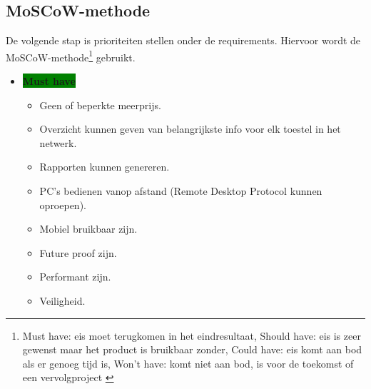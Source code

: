 \subsection{MoSCoW-methode}

De volgende stap is prioriteiten stellen onder de requirements. Hiervoor wordt de MoSCoW-methode\footnote{Must have: eis moet terugkomen in het eindresultaat, Should have: eis is zeer gewenst maar het product is bruikbaar zonder, Could have: eis komt aan bod als er genoeg tijd is, Won't have: komt niet aan bod, is voor de toekomst of een vervolgproject \autocite{Wikipedia2020}} gebruikt.

\begin{itemize}
    \item \textbf{\colorbox{green}{Must have}}
    \begin{itemize}
        \item Geen of beperkte meerprijs.
        \item Overzicht kunnen geven van belangrijkste info voor elk toestel in het netwerk.
        \item Rapporten kunnen genereren.
        \item PC's bedienen vanop afstand (Remote Desktop Protocol kunnen oproepen).
        \item Mobiel bruikbaar zijn.
        \item Future proof zijn.
        \item Performant zijn.
        \item Veiligheid.
        

\end{itemize}
\end{itemize}
